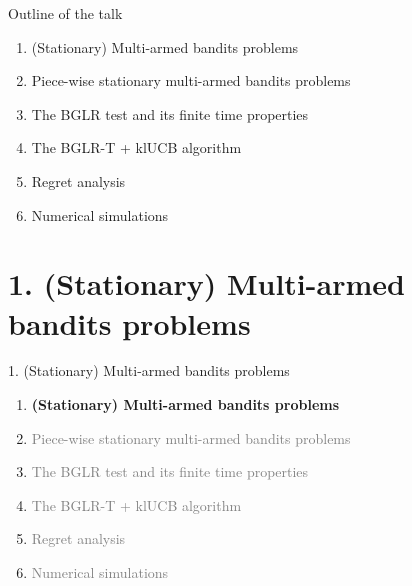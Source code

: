 \documentclass[11pt,english,ignorenonframetext,]{beamer}
\begin{document}
\begin{frame}{Outline of the talk}

  \begin{enumerate}
    \item
      (Stationary) Multi-armed bandits problems
    \vspace*{15pt}

    \item
      Piece-wise stationary multi-armed bandits problems
    \vspace*{15pt}

    \item
      The BGLR test and its finite time properties
    \vspace*{15pt}

    \item
      The BGLR-T + klUCB algorithm
    \vspace*{15pt}

    \item
      Regret analysis
    \vspace*{15pt}

    \item
      Numerical simulations
  \end{enumerate}

\end{frame}


\section{\hfill{}1. (Stationary) Multi-armed bandits problems\hfill{}}

\begin{frame}{1. (Stationary) Multi-armed bandits problems}

  \begin{enumerate}
    \item
    \alert{\textbf{%
      (Stationary) Multi-armed bandits problems
    }}
    \vspace*{15pt}

    \item
    \textcolor{gray}{
      Piece-wise stationary multi-armed bandits problems
    }
    \vspace*{15pt}

    \item
    \textcolor{gray}{
      The BGLR test and its finite time properties
    }
    \vspace*{15pt}

    \item
    \textcolor{gray}{
      The BGLR-T + klUCB algorithm
    }
    \vspace*{15pt}

    \item
    \textcolor{gray}{
      Regret analysis
    }
    \vspace*{15pt}

    \item
    \textcolor{gray}{
      Numerical simulations
    }
  \end{enumerate}

\end{frame}
\end{document}
